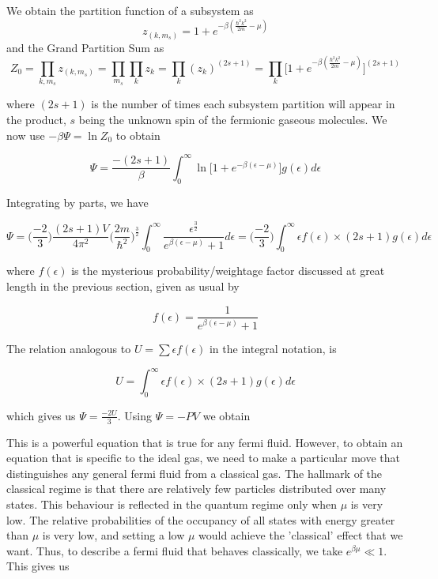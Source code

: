\documentclass[oneside]{book}
\begin{document}
We obtain the partition function of a subsystem as
\[ z_{(k,m_s)}  = 1 + e^{-\beta(\frac{\hbar^2k^2}{2m}-\mu)} \]
and the Grand Partition Sum as
\[Z_0 = \prod_{k,m_s}{}z_{(k,m_s)} = \prod_{m_s}^{}\prod_{k}^{}z_k = \prod_{k}^{}(z_k)^{(2s + 1)} 
= \prod_{k}^{}\Big[1 + e^{-\beta(\frac{\hbar^2k^2}{2m}-\mu)}\Big]^{(2s + 1)} \]

where $(2s + 1)$ is the number of times each subsystem partition will appear in the product, $s$ being the unknown spin of the fermionic gaseous molecules. We now use $-\beta\Psi = \ln Z_0$ to obtain

\[\Psi = \frac{-(2s+1)}{\beta}\int_{0}^{\infty} \ln\Big[1 + e^{-\beta(\epsilon-\mu)}\Big]g(\epsilon)d\epsilon \]


Integrating by parts, we have

\[\Psi = \Bigg(\frac{-2}{3}\Bigg)\frac{(2s+1)V}{4\pi^2}\Bigg(\frac{2m}{\hbar^2}\Bigg)^{\frac{3}{2}}\int_{0}^{\infty} \frac{\epsilon^{\frac{3}{2}}}{e^{\beta(\epsilon-\mu)}+1}d\epsilon 
=    \Bigg(\frac{-2}{3}\Bigg)\int_{0}^{\infty}\epsilon f(\epsilon) \times (2s+1)g(\epsilon)d\epsilon
\]

where $f(\epsilon)$ is the mysterious probability/weightage factor discussed at great length in the previous section, given as usual by

\[f(\epsilon) = \frac{1}{e^{\beta(\epsilon-\mu)}+1} \]

The relation analogous to $U = \sum\epsilon f(\epsilon)$ in the integral notation, is 

\[  U =  \int_{0}^{\infty}\epsilon f(\epsilon) \times (2s+1)g(\epsilon)d\epsilon \]

which gives us $\Psi = \frac{-2U}{3}$. Using $\Psi = -PV$ we obtain

\begin{center}
\end{center}

This is a powerful equation that is true for any fermi fluid. However, to obtain an equation that is specific to the ideal gas, we need to make a particular move that distinguishes any general fermi fluid from a classical gas. The hallmark of the classical regime is that there are relatively few particles distributed over many states. This behaviour is reflected in the quantum regime only when $\mu$ is very low. The relative probabilities of the occupancy of all states with energy greater than $\mu$ is very low, and setting a low $\mu$ would achieve the 'classical' effect that we want. Thus, to describe a fermi fluid that behaves classically, we take $e^{\beta\mu} \ll 1$. This gives us
\end{document}
